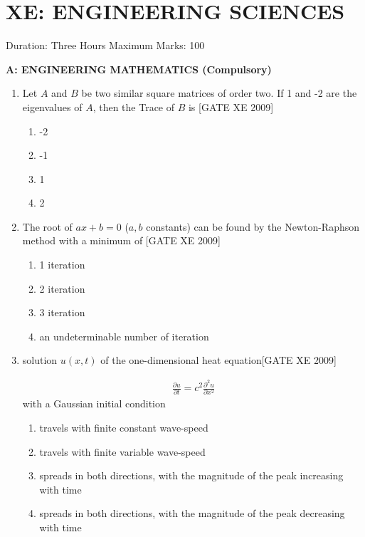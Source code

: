 \documentclass[journal,12pt,onecolumn]{IEEEtran}
\theoremstyle{remark}
\begin{document}
\section*{\hspace{1cm}XE: ENGINEERING SCIENCES}

     Duration: Three Hours \hspace{8 cm}  Maximum Marks: 100




\textbf{A: ENGINEERING MATHEMATICS (Compulsory)}



\begin{enumerate}

    \item Let $A$ and $B$ be two similar square matrices of order two. If 1 and -2 are the eigenvalues of $A$, then the Trace of $B$ is \hfill[GATE XE 2009]
    \begin{multicols}{4}
  \begin{enumerate}
      \item -2
       \item -1
       \item 1
        \item 2
  \end{enumerate}      
    \end{multicols}

  

    \item The root of $ax + b = 0$ ($a,b$ constants) can be found by the Newton-Raphson method with a minimum of \hfill[GATE XE 2009]
    
 \begin{multicols}{2}
\begin{enumerate}
 
\item  1 iteration 
\item 2 iteration 
\item 3 iteration 
\item an undeterminable number of iteration
\end{enumerate}
 \end{multicols}
    
   

   
    \item solution $u(x,t)$ of the one-dimensional heat equation\hfill[GATE XE 2009]
    
        
    \begin{align*}
        \frac{\partial u}{\partial t} = c^2 \frac{\partial^2 u}{\partial x^2}
    \end{align*}
    with a Gaussian initial condition
    \begin{enumerate}
        \item travels with finite constant wave-speed
        \item travels with finite variable wave-speed
        \item spreads in both directions, with the magnitude of the peak increasing with time
        \item spreads in both directions, with the magnitude of the peak decreasing with time
    \end{enumerate}


\end{enumerate}
\end{document}
